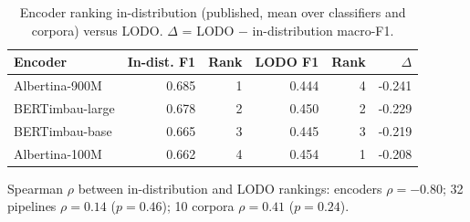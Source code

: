 \begin{table}[t]
\centering
\small
\caption{Encoder ranking in-distribution (published, mean over classifiers and corpora) versus LODO. $\Delta$ = LODO $-$ in-distribution macro-F1.}
\label{tab:lodo-vs-indist-encoders}
\begin{tabular}{lrrrrr}
\toprule
Encoder & In-dist. F1 & Rank & LODO F1 & Rank & $\Delta$ \\
\midrule
Albertina-900M & 0.685 & 1 & 0.444 & 4 & -0.241 \\
BERTimbau-large & 0.678 & 2 & 0.450 & 2 & -0.229 \\
BERTimbau-base & 0.665 & 3 & 0.445 & 3 & -0.219 \\
Albertina-100M & 0.662 & 4 & 0.454 & 1 & -0.208 \\
\bottomrule
\end{tabular}
\par\vspace{2pt}\footnotesize Spearman $\rho$ between in-distribution and LODO rankings: encoders $\rho=-0.80$; 32 pipelines $\rho=0.14$ ($p=0.46$); 10 corpora $\rho=0.41$ ($p=0.24$).
\end{table}
